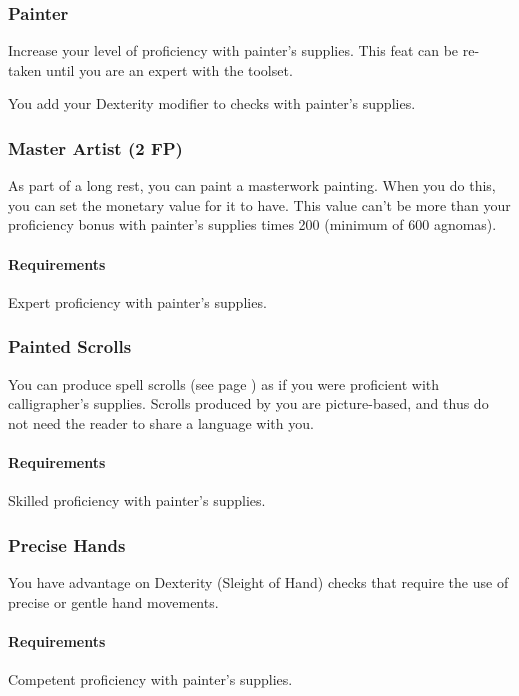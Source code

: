     \subsubsection{Painter} \label{feat::painter}
        Increase your level of proficiency with painter's supplies.
        This feat can be re-taken until you are an expert with the toolset.

        You add your Dexterity modifier to checks with painter's supplies.
    \subsubsection{Master Artist (2 FP)} \label{feat::masterartist}
        As part of a long rest, you can paint a masterwork painting.
        When you do this, you can set the monetary value for it to have.
        This value can't be more than your proficiency bonus with painter's supplies times 200 (minimum of 600 agnomas).
        \paragraph{Requirements} Expert proficiency with painter's supplies.
    \subsubsection{Painted Scrolls} \label{feat::paintedscrolls}
        You can produce spell scrolls (see page \pageref{item::spellscroll}) as if you were proficient with calligrapher's supplies.
        Scrolls produced by you are picture-based, and thus do not need the reader to share a language with you.
        \paragraph{Requirements} Skilled proficiency with painter's supplies.
    \subsubsection{Precise Hands} \label{feat::precisehands}
        You have advantage on Dexterity (Sleight of Hand) checks that require the use of precise or gentle hand movements.
        \paragraph{Requirements} Competent proficiency with painter's supplies.
